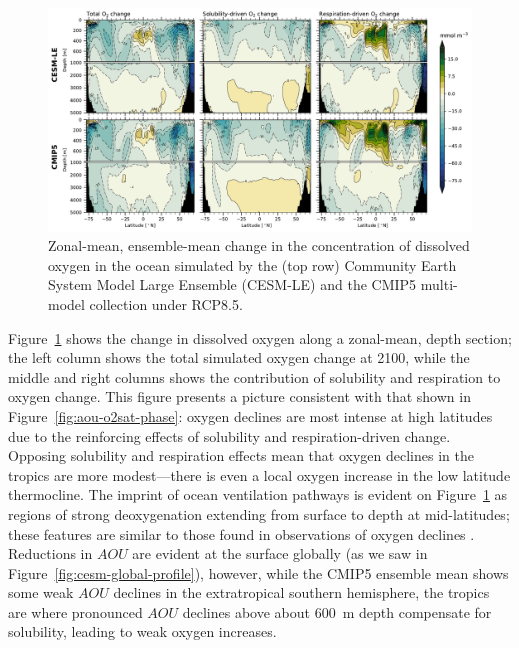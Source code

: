 \documentclass[draft,linenumbers]{report_chapter}
\begin{document}
\begin{figure}[tbhp]
\centering
\includegraphics[width=1\textwidth]{global-zonal-mean-O2-AOU-O2sat.pdf}
\caption{Zonal-mean, ensemble-mean change in the concentration of dissolved oxygen in the ocean simulated by the (top row) Community Earth System Model Large Ensemble (CESM-LE) and the CMIP5 multi-model collection under RCP8.5.}
\label{fig:zonal-mean-section}
\end{figure}

Figure~\ref{fig:zonal-mean-section} shows the change in dissolved oxygen along a zonal-mean, depth section; the left column shows the total simulated oxygen change at 2100, while the middle and right columns shows the contribution of solubility and respiration to oxygen change.
This figure presents a picture consistent with that shown in Figure~\ref{fig:aou-o2sat-phase}: oxygen declines are most intense at high latitudes due to the reinforcing effects of solubility and respiration-driven change.
Opposing solubility and respiration effects mean that oxygen declines in the tropics are more modest---there is even a local oxygen increase in the low latitude thermocline.
The imprint of ocean ventilation pathways is evident on Figure~\ref{fig:zonal-mean-section} as regions of strong deoxygenation extending from surface to depth at mid-latitudes; these features are similar to those found in observations of oxygen declines \citep{Helm-Bindoff-etal-2011}.
Reductions in $AOU$ are evident at the surface globally (as we saw in Figure~\ref{fig:cesm-global-profile}), however, while the CMIP5 ensemble mean shows some weak $AOU$ declines in the extratropical southern hemisphere, the tropics are where pronounced $AOU$ declines above about 600~m depth compensate for solubility, leading to weak oxygen increases.
\end{document}
